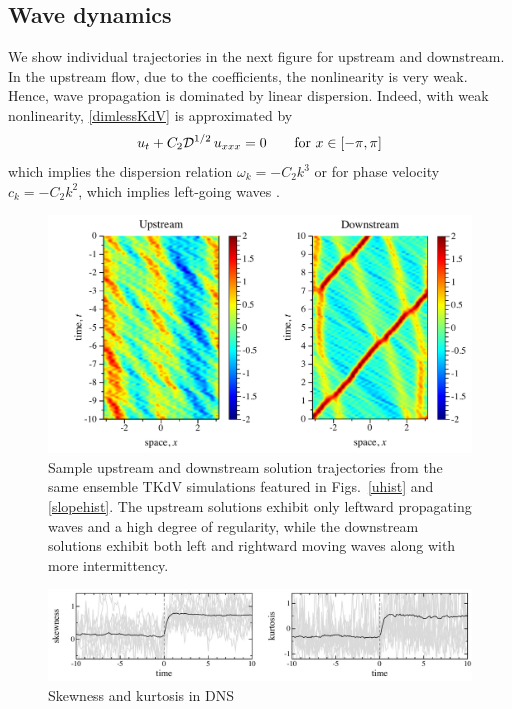 \documentclass[11pt]{article}
\newcommand{\drat}{\mathcal{D}}
\begin{document}
\subsection{Wave dynamics}

We show individual trajectories in the next figure for upstream and downstream. In the upstream flow, due to the coefficients, the nonlinearity is very weak. Hence, wave propagation is dominated by linear dispersion. Indeed, with weak nonlinearity, \eqref{dimlessKdV} is approximated by
\begin{equation}
u_t + C_2 \drat^{1/2} \, u_{xxx} = 0
\qquad \text{for } x \in [-\pi,\pi] \\
\end{equation}
which implies the dispersion relation $\omega_k = -C_2 k^3$ or for phase velocity $c_k = -C_2 k^2$, which implies left-going waves \cite{majdaqi2019}.

\begin{figure}%
\begin{center}
\includegraphics[width = 0.99 \linewidth]{Figs/trajectories.pdf}
\caption{
Sample upstream and downstream solution trajectories from the same ensemble TKdV simulations featured in Figs.~\ref{uhist} and \ref{slopehist}. The upstream solutions exhibit only leftward propagating waves and a high degree of regularity, while the downstream solutions exhibit both left and rightward moving waves along with more intermittency.
}
\label{trajectories}
\end{center}
\end{figure}

\begin{figure}%
\begin{center}
\includegraphics[width = 0.99 \linewidth]{Figs/skew-kurt.pdf}
\caption{
Skewness and kurtosis in DNS}
\label{skew-kurt}
\end{center}
\end{figure}
 
\end{document}
